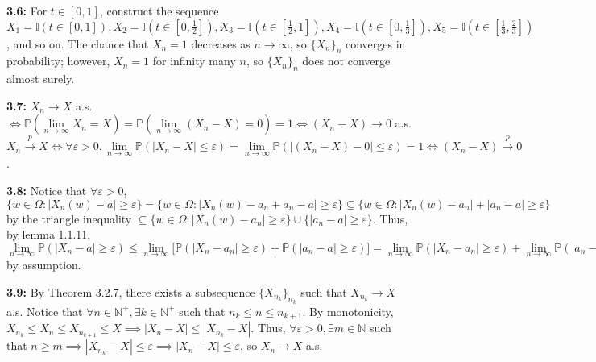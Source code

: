 \documentclass[12pt]{article}
\newcommand{\I}{\mathbb{I}}
\newcommand{\p}{\mathbb{P}}
\begin{document}
\textbf{3.6:} For $t \in [0, 1]$, construct the sequence $X_1 = \I(t \in [0, 1]), X_2 = \I(t \in [0, \frac{1}{2}]), X_3 = \I(t \in [\frac{1}{2}, 1]), X_4 = \I(t \in [0, \frac{1}{3}]), X_5 = \I(t \in [\frac{1}{3}, \frac{2}{3}])$, and so on. The chance that $X_n = 1$ decreases as $n \to \infty$, so $\{X_n\}_n$ converges in probability; however, $X_n = 1$ for infinity many $n$, so $\{X_n\}_n$ does not converge almost surely.

\textbf{3.7:} $X_n \to X$ a.s. $\iff \p(\lim \limits_{n \to \infty} X_n = X) = \p(\lim \limits_{n \to \infty} (X_n - X) = 0) = 1 \iff (X_n - X) \to 0$ a.s. $X_n \overset{p}{\to} X \iff \forall \varepsilon > 0, \lim \limits_{n \to \infty} \p(|X_n - X| \leq \varepsilon) = \lim \limits_{n \to \infty} \p(|(X_n - X) - 0| \leq \varepsilon) = 1 \iff (X_n - X) \overset{p}{\to} 0$.

\textbf{3.8:} Notice that $\forall \varepsilon > 0$, $\{w \in \Omega: |X_n(w) - a| \geq \varepsilon\} = \{w \in \Omega: |X_n(w) - a_n + a_n - a| \geq \varepsilon\} \subseteq \{w \in \Omega: |X_n(w) - a_n| + |a_n - a| \geq \varepsilon\}$ by the triangle inequality $\subseteq \{w \in \Omega: |X_n(w) - a_n| \geq \varepsilon\} \cup \{|a_n - a| \geq \varepsilon\}$. Thus, by lemma 1.1.11, $\lim \limits_{n \to \infty} \p(|X_n - a| \geq \varepsilon) \leq \lim \limits_{n \to \infty} \big[\p(|X_n - a_n| \geq \varepsilon) + \p(|a_n - a| \geq \varepsilon)\big] = \lim \limits_{n \to \infty} \p(|X_n - a_n| \geq \varepsilon) + \lim \limits_{n \to \infty} \p(|a_n - a| \geq \varepsilon) = 0$ by assumption.

\textbf{3.9:} By Theorem 3.2.7, there exists a subsequence $\{X_{n_k}\}_{n_k}$ such that $X_{n_k} \to X$ a.s. Notice that $\forall n \in \mathbb{N}^+, \exists k \in \mathbb{N}^+$ such that $n_{k} \leq n \leq n_{k+1}$. By monotonicity, $X_{n_{k}} \leq X_n \leq X_{n_{k+1}} \leq X \implies |X_n - X| \leq |X_{n_k} - X|$. Thus, $\forall \varepsilon > 0, \exists m \in \mathbb{N}$ such that $n \geq m \implies |X_{n_k} - X| \leq \varepsilon \implies |X_n - X| \leq \varepsilon$, so $X_n \to X$ a.s.
\end{document}
